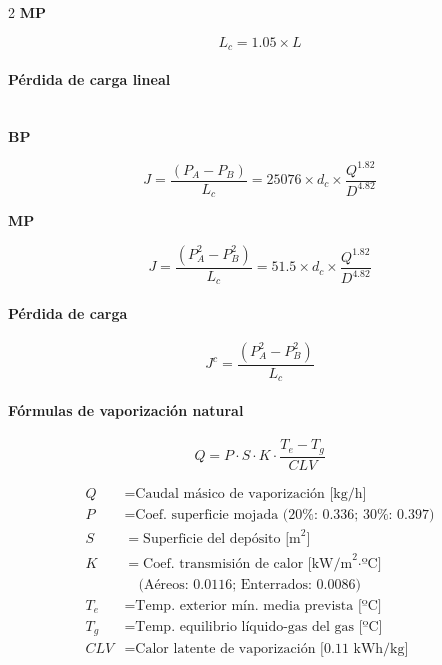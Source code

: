\documentclass[11pt]{article}
\begin{document}
\begin{multicols*}{2}
    \textbf{MP}

    \begin{equation*}
        L_c = 1.05 \times L    
    \end{equation*}

    \paragraph{Pérdida de carga lineal}\mbox{}\\
    \textbf{BP}

    \begin{equation*}
        J = \frac{\left(P_A - P_B\right)}{L_c} = 25076 \times d_c \times \frac{Q^{1.82}}{D^{4.82}}
    \end{equation*}

    \textbf{MP}

    \begin{equation*}
        J = \frac{\left(P_A^2 - P_B^2\right)}{L_c} = 51.5 \times d_c \times \frac{Q^{1.82}}{D^{4.82}}
    \end{equation*}
        
    \paragraph{Pérdida de carga}

    \begin{equation*}
        J^c = \frac{\left(P_A ^{2} - P_B ^{2}\right)}{L_c}
    \end{equation*}

    \paragraph{Fórmulas de vaporización natural}

    \begin{equation*}
        Q = P \cdot S \cdot K \cdot \frac{T_e - T_g}{CLV}
    \end{equation*}

    \begin{minipage}{\linewidth}
        \begin{align*}
            Q &= \text{Caudal másico de vaporización [kg/h]} \\
            P &= \text{Coef. superficie mojada (20\%: 0.336; 30\%: 0.397)} \\
            S &= \text{Superficie del depósito [m}^2\text{]} \\
            K &= \text{Coef. transmisión de calor [kW/m}^2\text{·ºC]} \\
              &\quad \text{(Aéreos: 0.0116; Enterrados: 0.0086)} \\
            T_e &= \text{Temp. exterior mín. media prevista [ºC]} \\
            T_g &= \text{Temp. equilibrio líquido-gas del gas [ºC]} \\
            CLV &= \text{Calor latente de vaporización [0.11 kWh/kg]}
        \end{align*}
    \end{minipage}


\end{multicols*}
\end{document}
